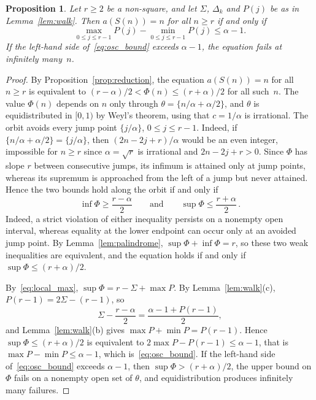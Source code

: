 \documentclass{birkjour}
\newtheorem{proposition}[theorem]{Proposition}
\theoremstyle{definition}
\theoremstyle{remark}
\begin{document}
\begin{proposition}\label{prop:oscillation}
Let $r\ge 2$ be a non-square, and let $\Sigma$, $\Delta_{k}$
and $P(j)$ be as in Lemma~\ref{lem:walk}. Then $a(S(n))=n$
for all $n\ge r$ if and only if
\begin{equation}\label{eq:osc_bound}
  \max_{0\le j\le r-1}P(j)-\min_{0\le j\le r-1}P(j)\le\alpha-1.
\end{equation}
If the left-hand side of~\eqref{eq:osc_bound} exceeds
$\alpha-1$, the equation fails at infinitely many~$n$.
\end{proposition}

\begin{proof}
By Proposition~\ref{prop:reduction}, the equation
$a(S(n))=n$ for all $n\ge r$ is equivalent to
$(r{-}\alpha)/2<\Phi(n)\le(r{+}\alpha)/2$ for all
such~$n$. The value $\Phi(n)$ depends on $n$ only through
$\theta=\{n/\alpha+\alpha/2\}$, and $\theta$ is
equidistributed in $[0,1)$ by Weyl's theorem, using that
$c=1/\alpha$ is irrational. The orbit avoids every jump point
$\{j/\alpha\}$, $0\le j\le r-1$. Indeed, if
$\{n/\alpha+\alpha/2\}=\{j/\alpha\}$, then $(2n-2j+r)/\alpha$
would be an even integer, impossible for $n\ge r$ since
$\alpha=\sqrt{r}$ is irrational and $2n-2j+r>0$. Since $\Phi$
has slope $r$ between consecutive jumps, its infimum is
attained only at jump points, whereas its supremum is
approached from the left of a jump but never attained. Hence
the two bounds hold along the orbit if and only if
\[
  \inf\Phi\ge\frac{r-\alpha}{2}
  \qquad\text{and}\qquad
  \sup\Phi\le\frac{r+\alpha}{2}\,.
\]
Indeed, a strict violation of either inequality persists on a
nonempty open interval, whereas equality at the lower endpoint
can occur only at an avoided jump point. By
Lemma~\ref{lem:palindrome}, $\sup\Phi+\inf\Phi=r$, so these two
weak inequalities are equivalent, and the equation holds if
and only if $\sup\Phi\le(r{+}\alpha)/2$.

By~\eqref{eq:local_max}, $\sup\Phi=r-\Sigma+\max P$. By
Lemma~\ref{lem:walk}(c), $P(r{-}1)=2\Sigma-(r{-}1)$, so
\[
  \Sigma-\frac{r-\alpha}{2}=\frac{\alpha-1+P(r{-}1)}{2},
\]
and Lemma~\ref{lem:walk}(b) gives
$\max P+\min P=P(r{-}1)$. Hence $\sup\Phi\le(r{+}\alpha)/2$ is
equivalent to $2\max P-P(r{-}1)\le\alpha-1$, that is
$\max P-\min P\le\alpha-1$, which is~\eqref{eq:osc_bound}. If
the left-hand side of~\eqref{eq:osc_bound} exceeds $\alpha-1$,
then $\sup\Phi>(r{+}\alpha)/2$, the upper bound on
$\Phi$ fails on a nonempty open set of $\theta$, and
equidistribution produces infinitely many failures.
\end{proof}
\end{document}
